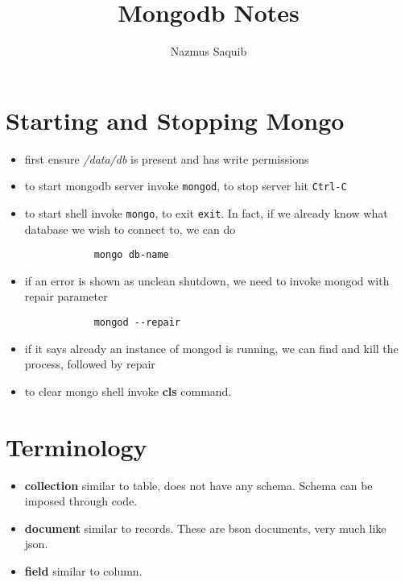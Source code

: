 \documentclass[a4paper, 12pt]{article}
\begin{document}
\title{Mongodb Notes}
\author{Nazmus Saquib}

\maketitle
\tableofcontents

\section{Starting and Stopping Mongo}
\begin{itemize}
    \item first ensure \emph{/data/db} is present and has write permissions
    \item to start mongodb server invoke \verb|mongod|, to stop server hit \verb|Ctrl-C|
    \item to start shell invoke \verb|mongo|, to exit \verb|exit|. In fact, if we already know what database we wish to connect to, we can do
        \begin{verbatim}
            mongo db-name
        \end{verbatim}
    \item if an error is shown as unclean shutdown, we need to invoke mongod with repair parameter
        \begin{verbatim}
            mongod --repair
        \end{verbatim}
    \item if it says already an instance of mongod is running, we can find and kill the process, followed by repair
    \item to clear mongo shell invoke \textbf{cls} command.
\end{itemize}

\section{Terminology}
\begin{itemize}
    \item \textbf{collection} similar to table, does not have any schema. Schema can be imposed through code.
    \item \textbf{document} similar to records. These are bson documents, very much like json.
    \item \textbf{field} similar to column.
\end{itemize}

\end{document}
